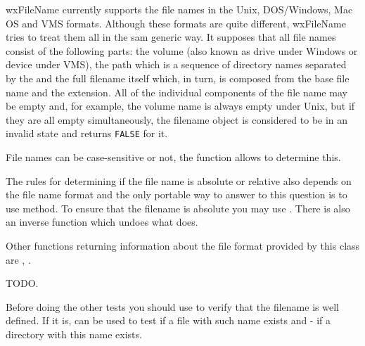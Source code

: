

wxFileName currently supports the file names in the Unix, DOS/Windows, Mac OS
and VMS formats. Although these formats are quite different, wxFileName tries
to treat them all in the sam generic way. It supposes that all file names
consist of the following parts: the volume (also known as drive under Windows
or device under VMS), the path which is a sequence of directory names separated
by the  and the full
filename itself which, in turn, is composed from the base file name and the
extension. All of the individual components of the file name may be empty and,
for example, the volume name is always empty under Unix, but if they are all
empty simultaneously, the filename object is considered to be in an invalid
state and  returns {\tt FALSE} for it.

File names can be case-sensitive or not, the function\rtfsp
{} allows to determine this.

The rules for determining if the file name is absolute or relative also depends
on the file name format and the only portable way to answer to this question is
to use  method. To ensure that the
filename is absolute you may use . There
is also an inverse function  
which undoes what  
does.

Other functions returning information about the file format provided by this
class are ,\rtfsp
{}.



TODO.


Before doing the other tests you should use  to
verify that the filename is well defined. If it is, 
 can be used to test if a file with
such name exists and  - if a directory
with this name exists.

